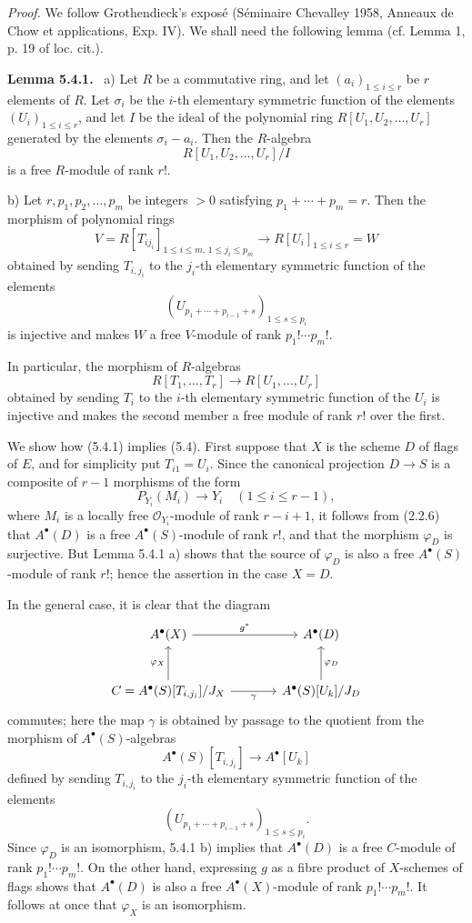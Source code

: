 \documentclass[11pt]{article}
\newenvironment{statement}[1]{\par\medskip\noindent\textbf{#1.}\ }{\par\medskip}
\begin{document}
\emph{Proof.} We follow Grothendieck's exposé (Séminaire Chevalley 1958, Anneaux de Chow et applications, Exp. IV). We shall need the following lemma (cf. Lemma 1, p. 19 of loc. cit.).

\begin{statement}{Lemma 5.4.1}
a) Let $R$ be a commutative ring, and let $(a_i)_{1\le i\le r}$ be $r$ elements of $R$. Let $\sigma_i$ be the $i$-th elementary symmetric function of the elements $(U_i)_{1\le i\le r}$, and let $I$ be the ideal of the polynomial ring $R[U_1,U_2,\ldots,U_r]$ generated by the elements $\sigma_i-a_i$. Then the $R$-algebra
\[
R[U_1,U_2,\ldots,U_r]/I
\]
is a free $R$-module of rank $r!$.

b) Let $r,p_1,p_2,\ldots,p_m$ be integers $>0$ satisfying $p_1+\cdots+p_m=r$. Then the morphism of polynomial rings
\[
V=R[T_{ij_i}]_{1\le i\le m,\,1\le j_i\le p_m}
\longrightarrow R[U_i]_{1\le i\le r}=W
\]
obtained by sending $T_{i,j_i}$ to the $j_i$-th elementary symmetric function of the elements
\[
(U_{p_1+\cdots+p_{i-1}+s})_{1\le s\le p_i}
\]
is injective and makes $W$ a free $V$-module of rank $p_1!\cdots p_m!$.

In particular, the morphism of $R$-algebras
\[
R[T_1,\ldots,T_r]\to R[U_1,\ldots,U_r]
\]
obtained by sending $T_i$ to the $i$-th elementary symmetric function of the $U_i$ is injective and makes the second member a free module of rank $r!$ over the first.
\end{statement}

We show how (5.4.1) implies (5.4). First suppose that $X$ is the scheme $D$ of flags of $E$, and for simplicity put $T_{i1}=U_i$. Since the canonical projection $D\to S$ is a composite of $r-1$ morphisms of the form
\[
P_{Y_i}(M_i)\to Y_i\quad(1\le i\le r-1),
\]
where $M_i$ is a locally free $\mathcal O_{Y_i}$-module of rank $r-i+1$, it follows from (2.2.6) that $A^{\bullet}(D)$ is a free $A^{\bullet}(S)$-module of rank $r!$, and that the morphism $\varphi_D$ is surjective. But Lemma 5.4.1 a) shows that the source of $\varphi_D$ is also a free $A^{\bullet}(S)$-module of rank $r!$; hence the assertion in the case $X=D$.

In the general case, it is clear that the diagram
\[
\begin{tikzcd}[column sep=large,row sep=large]
A^{\bullet}(X) \arrow[r,"g^*"] & A^{\bullet}(D)\\
C=A^{\bullet}(S)[T_{i,j_i}]/J_X \arrow[u,"\varphi_X"] \arrow[r,"\gamma"'] &
A^{\bullet}(S)[U_k]/J_D \arrow[u,"\varphi_D"']
\end{tikzcd}
\]
commutes; here the map $\gamma$ is obtained by passage to the quotient from the morphism of $A^{\bullet}(S)$-algebras
\[
A^\bullet(S)[T_{i,j_i}]\to A^\bullet[U_k]
\]
defined by sending $T_{i,j_i}$ to the $j_i$-th elementary symmetric function of the elements
\[
(U_{p_1+\cdots+p_{i-1}+s})_{1\le s\le p_i}.
\]
Since $\varphi_D$ is an isomorphism, 5.4.1 b) implies that $A^{\bullet}(D)$ is a free $C$-module of rank $p_1!\cdots p_m!$. On the other hand, expressing $g$ as a fibre product of $X$-schemes of flags shows that $A^{\bullet}(D)$ is also a free $A^{\bullet}(X)$-module of rank $p_1!\cdots p_m!$. It follows at once that $\varphi_X$ is an isomorphism.
\end{document}
